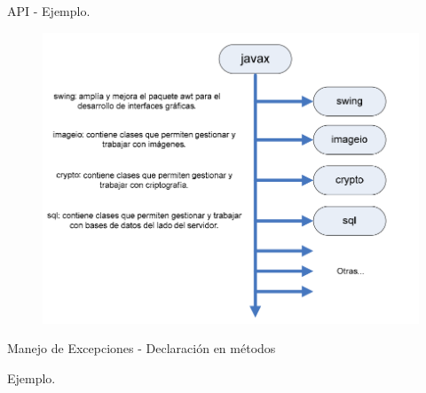 \begin{frame}{API - Ejemplo.}
  \begin{figure}
    \includegraphics[scale=0.4]{figuras/API_Javax.PNG}
  \end{figure}
\end{frame}

\begin{frame}{Manejo de Excepciones - Declaraci\'on en m\'etodos}
	\begin{block}{Ejemplo.}

\end{block}
\end{frame}
